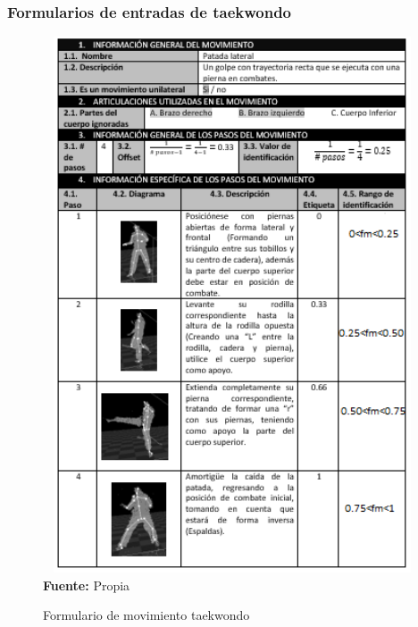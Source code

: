 \subsubsection{Formularios de entradas de taekwondo}
\begin{figure}[H]
	\caption{Formulario de movimiento taekwondo}
	\label{fig:frmWhiteMov}
	\centering	\includegraphics[width=445px,height=600px]{graphics/resultados/movimientoTaekwondo.PNG} \\
	\textbf{Fuente:} Propia
\end{figure}
